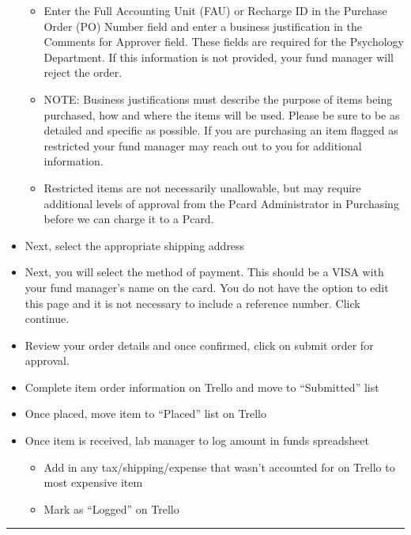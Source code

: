 \documentclass[]{book}
\providecommand{\tightlist}{%
  \setlength{\itemsep}{0pt}\setlength{\parskip}{0pt}}
\begin{document}
\begin{itemize}
  \begin{itemize}
  \tightlist
  \item
    Enter the Full Accounting Unit (FAU) or Recharge ID in the Purchase Order (PO) Number field and enter a business justification in the Comments for Approver field. These fields are required for the Psychology Department. If this information is not provided, your fund manager will reject the order.
  \item
    NOTE: Business justifications must describe the purpose of items being purchased, how and where the items will be used. Please be sure to be as detailed and specific as possible. If you are purchasing an item flagged as restricted your fund manager may reach out to you for additional information.\\
  \item
    Restricted items are not necessarily unallowable, but may require additional levels of approval from the Pcard Administrator in Purchasing before we can charge it to a Pcard.
  \end{itemize}
\item
  Next, select the appropriate shipping address
\item
  Next, you will select the method of payment. This should be a VISA with your fund manager's name on the card. You do not have the option to edit this page and it is not necessary to include a reference number. Click continue.
\item
  Review your order details and once confirmed, click on submit order for approval.
\item
  Complete item order information on Trello and move to ``Submitted'' list
\item
  Once placed, move item to ``Placed'' list on Trello
\item
  Once item is received, lab manager to log amount in funds spreadsheet

  \begin{itemize}
  \tightlist
  \item
    Add in any tax/shipping/expense that wasn't accounted for on Trello to most expensive item
  \item
    Mark as ``Logged'' on Trello
  \end{itemize}
\end{itemize}

\begin{center}\rule{0.5\linewidth}{\linethickness}\end{center}
\end{document}
